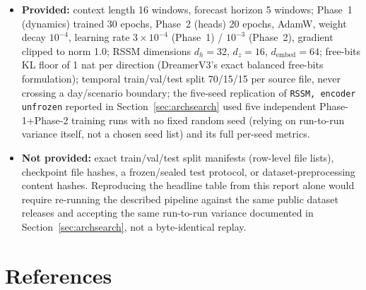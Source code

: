 \documentclass[11pt]{article}
\newcommand{\code}[1]{\texttt{#1}}
\begin{document}
\begin{itemize}[leftmargin=1.5em]
  \item \textbf{Provided:} context length 16 windows, forecast horizon 5 windows; Phase~1
  (dynamics) trained 30 epochs, Phase~2 (heads) 20 epochs, AdamW, weight decay $10^{-4}$,
  learning rate $3\times10^{-4}$ (Phase~1) / $10^{-3}$ (Phase~2), gradient clipped to norm 1.0;
  RSSM dimensions $d_h{=}32$, $d_z{=}16$, $d_{\mathrm{embed}}{=}64$; free-bits KL floor of 1
  nat per direction (DreamerV3's exact balanced free-bits formulation); temporal
  train/val/test split 70/15/15 per source file, never crossing a day/scenario boundary; the
  five-seed replication of \code{RSSM, encoder unfrozen} reported in
  Section~\ref{sec:archsearch} used five independent Phase-1+Phase-2 training runs with no
  fixed random seed (relying on run-to-run variance itself, not a chosen seed list) and its
  full per-seed metrics.
  \item \textbf{Not provided:} exact train/val/test split manifests (row-level file lists),
  checkpoint file hashes, a frozen/sealed test protocol, or dataset-preprocessing content
  hashes. Reproducing the headline table from this report alone would require re-running the
  described pipeline against the same public dataset releases and accepting the same run-to-run
  variance documented in Section~\ref{sec:archsearch}, not a byte-identical replay.
\end{itemize}

\section*{References}
\end{document}
